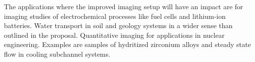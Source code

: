 \documentclass[a4paper,11pt]{scrreprt}
\begin{document}
The applications where the improved imaging setup will have an impact are for imaging studies of
electrochemical processes like fuel cells and lithium-ion batteries. Water transport in soil 
and geology systems in a wider sense than outlined in the proposal. Quantitative imaging 
for applications in nuclear engineering. Examples are samples of hydritized zirconium alloys 
and steady state flow in cooling subchannel systems. 



\end{document}
